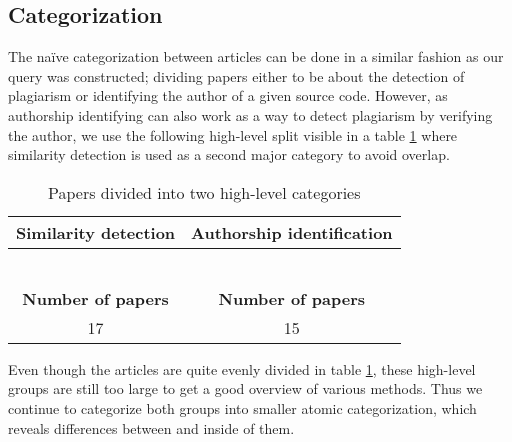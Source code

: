 \subsection{Categorization}

The naïve categorization between articles can be done in a similar fashion as our query was constructed; dividing papers either to be about the detection of plagiarism or identifying the author of a given source code. However, as authorship identifying can also work as a way to detect plagiarism by verifying the author, we use the following high-level split visible in a table \ref{table-highcateq} where similarity detection is used as a second major category to avoid overlap.

\begin{table}[ht]
    \caption{Papers divided into two high-level categories}
    \label{table-highcateq}
    \centering
    \begin{tabular}{ | c | c | }
        
        \hline
        {\bf Similarity detection} & {\bf Authorship identification} \\ \hline
    
        \cite{AFAPLI2015, LICD2010, AASCPD2012} & \cite{SCAANN2017, ABEC2014, CAPSCAP2014}   \\
        \cite{Heblikar2015NormalizationBS, USCR2014, AIR2015} &  \cite{SCANG2007, EJPFSAI2004, ACSBPD2012}\\
        \cite{OTIOLSS2015, BUAA2009, ramirez2015high} &  \cite{APASCAI2007, UCMHGAAI2007, ESHPFSCAC2008}\\
        \cite{Ohmann2015, TBCFPD2012, Fu2017WASTKAW} &  \cite{AIRTSCAA2009, TSUDIJSCAI2011, DNNSCAI2013} \\
        \cite{ASTMLPD2013, AAPSCDPTK2013, CPDPPD2013}    & \cite{SCAIUFL2013, SDNAIJSP2015, AISC2017} \\
        \cite{PACASCD2005, RCISCP2017} &  \\ \hline
        {\bf Number of papers} & {\bf Number of papers} \\ \hline
        17 & 15 \\ \hline
    \end{tabular}
\end{table}

\noindent
Even though the articles are quite evenly divided in table \ref{table-highcateq}, these high-level groups are still too large to get a good overview of various methods. Thus we continue to categorize both groups into smaller atomic categorization, which reveals differences between and inside of them.  


